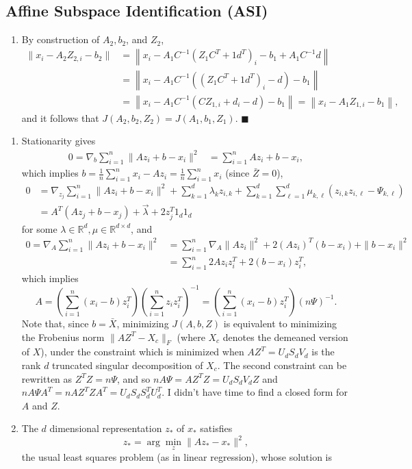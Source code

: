\documentclass[11pt]{article}
\renewcommand{\qed}{\quad \ensuremath{\blacksquare}}
\newcommand{\inv}{^{-1}}
\newcommand{\R}{\mathbb{R}} %
\begin{document}
\subsection{Affine Subspace Identification (ASI)}
\begin{enumerate}
\item By construction of $A_2,b_2$, and $Z_2$,
\begin{align*}
\|x_i - A_2Z_{2,i} - b_2\|
 &  = \left\| x_i - A_1C\inv (Z_1C^T + 1d^T)_i - b_1 + A_1C\inv d \right\|  \\
 &  = \left\| x_i - A_1C\inv\left( (Z_1C^T + 1d^T)_i - d \right) - b_1 \right\| \\
 &  = \left\| x_i - A_1C\inv\left( CZ_{1,i} + d_i - d \right) - b_1 \right\|
    = \left\| x_i - A_1Z_{1,i} - b_1 \right\|,
\end{align*}
and it follows that $J(A_2,b_2,Z_2) = J(A_1,b_1,Z_1)$. \qed
\end{enumerate}
\begin{enumerate}
\item Stationarity gives
\begin{align*}
0
    = \nabla_b \sum_{i = 1}^n \|Az_i + b - x_i\|^2
 &  = \sum_{i = 1}^n Az_i + b - x_i,
\end{align*}
which implies
$b = \frac1n \sum_{i = 1}^n x_i - Az_i
    = \frac1n \sum_{i = 1}^n x_i$ (since $\bar{Z} = 0$),
\begin{align*}
0
 &  = \nabla_{z_j} \sum_{i = 1}^n \|Az_i + b - x_i\|^2
        + \sum_{k = 1}^d \lambda_k z_{i,k}
        + \sum_{k = 1}^d \sum_{\ell = 1}^d
                            \mu_{k,\ell} (z_{i,k}z_{i,\ell} - \Psi_{k,\ell}) \\
 &  = A^T(Az_j + b - x_j) + \vec\lambda + 2z_j^T1_d1_d
\end{align*}
for some $\lambda \in \R^d, \mu \in \R^{d \times d}$, and
\begin{align*}
0
    = \nabla_A \sum_{i = 1}^n \|Az_i + b - x_i\|^2
 &  = \sum_{i = 1}^n \nabla_A \|Az_i\|^2 + 2(Az_i)^T(b - x_i) + \|b - x_i\|^2 \\
 &  = \sum_{i = 1}^n 2Az_iz_i^T + 2(b - x_i)z_i^T,
\end{align*}
which implies
\[A
    = \left( \sum_{i = 1}^n (x_i - b)z_i^T \right)
                                \left( \sum_{i = 1}^n z_iz_i^T \right)\inv
    = \left( \sum_{i = 1}^n (x_i - b)z_i^T \right)
                                \left( n \Psi \right)\inv
.\]
Note that, since $b = \bar X$, minimizing $J(A,b,Z)$ is equivalent to
minimizing the Frobenius norm $\|AZ^T - X_c\|_F$ (where $X_c$ denotes the
demeaned version of $X$), under the constraint which is minimized when
$AZ^T = U_dS_dV_d$ is the rank $d$ truncated singular decomposition of $X_c$.
The second constraint can be rewritten as $Z^TZ = n\Psi$, and so
$nA\Psi = AZ^TZ = U_dS_dV_dZ$ and $nA\Psi A^T = nAZ^TZA^T = U_dS_dS_d^TU_d^T$.
I didn't have time to find a closed form for $A$ and $Z$.

\item The $d$ dimensional representation $z_*$ of $x_*$ satisfies
\[z_* = \arg\min_z \|Az_* - x_*\|^2,\]
the usual least squares problem (as in linear regression), whose solution is
\fbox{$z_* = (A^TA)\inv A^Tx_*$.}
\end{enumerate}
\end{document}
